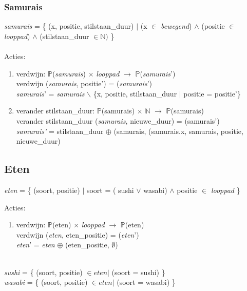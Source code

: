 

\subsubsection{Samurais}\label{sec:samurai} %

\emph{samurais} = \{ (x, positie, stilstaan\_duur) $|$ (x $\in$ \emph{bewegend}) $\land$ (positie $\in$ \emph{looppad}) $\land$ (stilstaan\_duur $\in \mathbb{N})$ \}\\ \\


Acties:
\begin{enumerate}
  \item verdwijn: $\mathbb{P}$(\emph{samurais}) $\times$ \emph{looppad} $\rightarrow$ $\mathbb{P}$(\emph{samurais}') \\
  verdwijn (\emph{samurais}, positie') = (\emph{samurais}') \\
  \emph{samurais}' = \emph{samurais} $\backslash$ \{x, positie, stilstaan\_duur $|$ positie = positie'\}
  \item verander stilstaan\_duur: $\mathbb{P}$(samurais) $\times$ $\mathbb{N}$ $\rightarrow$ $\mathbb{P}$(samurais) \\
  verander stilstaan\_duur (\emph{samurais}, nieuwe\_duur) = (samurais') \\
  \emph{samurais'} = stilstaan\_duur $\oplus$ (samurais, (samurais.x, samurais, positie,  nieuwe\_duur)
\end{enumerate}




\subsection{Eten}\label{sub:eten} %
\emph{eten} = \{ (soort, positie) $|$ soort = ( sushi $\lor$ wasabi) $\land$ positie $\in$ \emph{looppad} \} \newline

Acties:
\begin{enumerate}
  \item verdwijn: $\mathbb{P}$(eten) $\times$ \emph{looppad} $\rightarrow$ $\mathbb{P}$(eten) \\
  verdwijn (\emph{eten}, eten\_positie) = (\emph{eten}') \\
  \emph{eten}' = \emph{eten} $\oplus$ (eten\_positie, $\emptyset$)

\end{enumerate}
\ \\
\emph{sushi} = \{ (soort, positie) $\in eten |$ (soort = sushi) \} \\
\emph{wasabi} = \{ (soort, positie) $\in eten |$ (soort = wasabi)  \}



